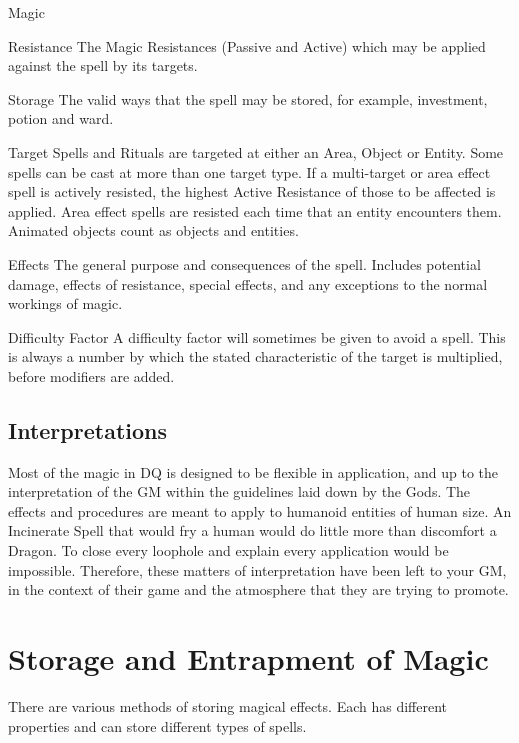 \begin{Chapter}{Magic}
\begin{Description}
\item[Resistance] The Magic Resistances (Passive and Active) which may
  be applied against the spell by its targets.

\item[Storage] The valid ways that the spell may be stored, for
  example, investment, potion and ward.

\item[Target] Spells and Rituals are targeted at either an Area,
  Object or Entity.  Some spells can be cast at more than one target
  type. If a multi-target or area effect spell is actively resisted,
  the highest Active Resistance of those to be affected is applied.
  Area effect spells are resisted each time that an entity encounters
  them.  Animated objects count as objects and entities.

\item[Effects] The general purpose and consequences of the spell.
  Includes potential damage, effects of resistance, special effects,
  and any exceptions to the normal workings of magic.

\item[Difficulty Factor] A difficulty factor will sometimes be given
  to avoid a spell.  This is always a number by which the stated
  characteristic of the target is multiplied, before modifiers are
  added.

\end{Description}
  
\subsection{Interpretations}

Most of the magic in DQ is designed to be flexible in application, and
up to the interpretation of the GM within the guidelines laid down by
the Gods.  The effects and procedures are meant to apply to humanoid
entities of human size.  An Incinerate Spell that would fry a human
would do little more than discomfort a Dragon. To close every loophole
and explain every application would be impossible.  Therefore, these
matters of interpretation have been left to your GM, in the context of
their game and the atmosphere that they are trying to promote.


\section{Storage and Entrapment of Magic}

There are various methods of storing magical effects.  Each has
different properties and can store different types of spells.


\end{Chapter}
